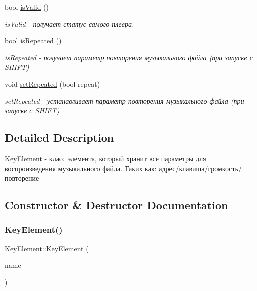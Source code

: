 \begin{DoxyCompactItemize}
bool \hyperlink{class_key_element_ae4ec608b097cae6a325cbfc0d70ac01d}{is\+Valid} ()
\begin{DoxyCompactList}\small\item\em is\+Valid -\/ получает статус самого плеера. \end{DoxyCompactList}\item 
bool \hyperlink{class_key_element_a1b70040900c774127a3c1b6530e3374a}{is\+Repeated} ()
\begin{DoxyCompactList}\small\item\em is\+Repeated -\/ получает параметр повторения музыкального файла (при запуске с S\+H\+I\+FT) \end{DoxyCompactList}\item 
void \hyperlink{class_key_element_a3e9909b7a88b5bbba3b9fafe0d3a6652}{set\+Repeated} (bool repeat)
\begin{DoxyCompactList}\small\item\em set\+Repeated -\/ устанавливает параметр повторения музыкального файла (при запуске с S\+H\+I\+FT) \end{DoxyCompactList}\end{DoxyCompactItemize}


\subsection{Detailed Description}
\hyperlink{class_key_element}{Key\+Element} -\/ класс элемента, который хранит все параметры для воспроизведения музыкального файла. Таких как\+: адрес/клавиша/громкость/повторение 

\subsection{Constructor \& Destructor Documentation}
\mbox{\label{class_key_element_aee0ae2b886fdc51944e3ea51d5f78162}} 
\subsubsection{\texorpdfstring{Key\+Element()}{KeyElement()}}
{\footnotesize\ttfamily Key\+Element\+::\+Key\+Element (\begin{DoxyParamCaption}\item[{Q\+String}]{name }\end{DoxyParamCaption})}



